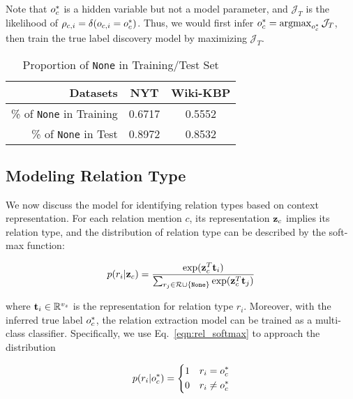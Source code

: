 Note that $o_c^*$ is a hidden variable but not a model parameter, and $\mathcal{J}_T$ is the likelihood of $\rho_{c, i} = \delta(o_{c, i} = o_c^*)$. 
Thus, we would first infer $o_c^* = \operatorname*{argmax}_{o_c^*} \mathcal{J}_T$, then train the true label discovery model by maximizing $\mathcal{J}_T$.


\begin{table}[t]
\centering
\begin{tabular}{r|c|c}
\hline
\textbf{Datasets} & \textbf{NYT} & \textbf{Wiki-KBP} \\
\hline
\hline
\% of \texttt{None} in Training & 0.6717 & 0.5552\\
\hline
\% of \texttt{None} in Test & 0.8972 & 0.8532\\
\hline
\end{tabular}
\caption{Proportion of \texttt{None} in Training/Test Set}
\label{tab:twoKLF}
\end{table}

\subsection{Modeling Relation Type }
We now discuss the model for identifying relation types based on context representation. For each relation mention $c$, its representation $\mathbf{z}_c$ implies its relation type, and the distribution of relation type can be described by the soft-max function:

\begin{small}
\begin{equation}
p(r_i | \mathbf{z}_c) = \frac{\exp(\mathbf{z}_c^T\mathbf{t}_i)}{\sum_{r_j \in \mathcal{R}\cup\{\texttt{None}\}} \exp(\mathbf{z}_c^T \mathbf{t}_j)} \label{eqn:rel_softmax}
\end{equation}
\end{small}
where $\mathbf{t}_i \in \mathbb{R}^{v_z}$ is the representation for relation type $r_i$. Moreover, with the inferred true label $o_c^*$, the relation extraction model can be trained as a multi-class classifier. Specifically, we use Eq.~\ref{eqn:rel_softmax} to approach the distribution

\begin{small}
\begin{equation}
p(r_i |o_c^*) = \left\{
\begin{aligned}
1 && r_i = o_c^* \\
0 && r_i \neq o_c^*
\end{aligned}
\right.
\label{eqn:one_hot_dist}
\end{equation}
\end{small}

